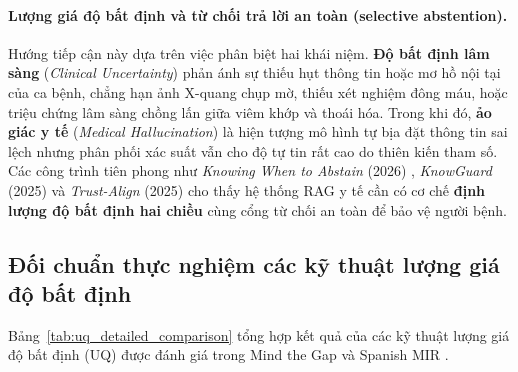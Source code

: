 \paragraph{Lượng giá độ bất định và từ chối trả lời an toàn (selective abstention).}
Hướng tiếp cận này dựa trên việc phân biệt hai khái niệm. \textbf{Độ bất định lâm sàng} (\emph{Clinical Uncertainty}) phản ánh sự thiếu hụt thông tin hoặc mơ hồ nội tại của ca bệnh, chẳng hạn ảnh X-quang chụp mờ, thiếu xét nghiệm đông máu, hoặc triệu chứng lâm sàng chồng lấn giữa viêm khớp và thoái hóa. Trong khi đó, \textbf{ảo giác y tế} (\emph{Medical Hallucination}) là hiện tượng mô hình tự bịa đặt thông tin sai lệch nhưng phân phối xác suất vẫn cho độ tự tin rất cao do thiên kiến tham số. Các công trình tiên phong như \emph{Knowing When to Abstain} (2026) \cite{knowing_when_abstain_2026}, \emph{KnowGuard} (2025) \cite{knowguard2024} và \emph{Trust-Align} (2025) \cite{filice2025generate} cho thấy hệ thống RAG y tế cần có cơ chế \textbf{định lượng độ bất định hai chiều} cùng cổng từ chối an toàn để bảo vệ người bệnh.

\subsection{Đối chuẩn thực nghiệm các kỹ thuật lượng giá độ bất định}
Bảng~\ref{tab:uq_detailed_comparison} tổng hợp kết quả của các kỹ thuật lượng giá độ bất định (UQ) được đánh giá trong Mind the Gap \cite{mind_the_gap_2026} và Spanish MIR \cite{spanish_mir_2026}.

